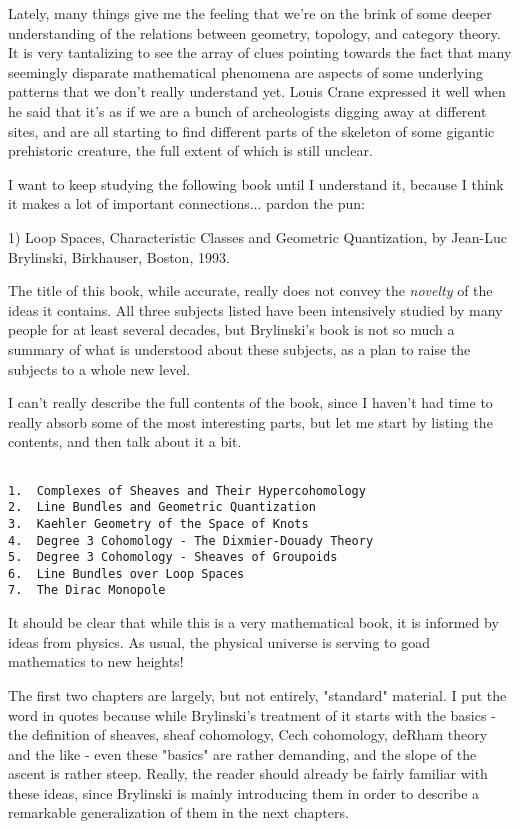 

Lately, many things give me the feeling that we're on the brink of
some deeper understanding of the relations between geometry, topology,
and category theory.  It is very tantalizing to see the array of clues
pointing towards the fact that many seemingly disparate mathematical
phenomena are aspects of some underlying patterns that we don't really
understand yet.  Louis Crane expressed it well when he said that it's as
if we are a bunch of archeologists digging away at different sites,
and are all starting to find different parts of the skeleton of some
gigantic prehistoric creature, the full extent of which is still unclear.

I want to keep studying the following book until I understand it,
because I think it makes a lot of important connections... pardon the
pun:

1) Loop Spaces, Characteristic Classes and Geometric Quantization,
by Jean-Luc Brylinski, Birkhauser, Boston, 1993.

The title of this book, while accurate, really does not convey the
\emph{novelty} of the ideas it contains.  All three subjects listed have been
intensively studied by many people for at least several decades, but
Brylinski's book is not so much a summary of what is understood about
these subjects, as a plan to raise the subjects to a whole new level.

I can't really describe the full contents of the book, since I haven't
had time to really absorb some of the most interesting parts, but let me
start by listing the contents, and then talk about it a bit.


\begin{verbatim}

1.  Complexes of Sheaves and Their Hypercohomology
2.  Line Bundles and Geometric Quantization
3.  Kaehler Geometry of the Space of Knots
4.  Degree 3 Cohomology - The Dixmier-Douady Theory
5.  Degree 3 Cohomology - Sheaves of Groupoids
6.  Line Bundles over Loop Spaces
7.  The Dirac Monopole
\end{verbatim}
    

It should be clear that while this is a very mathematical book, it is
informed by ideas from physics.  As usual, the physical universe is
serving to goad mathematics to new heights!  

The first two chapters are largely, but not entirely, "standard"
material.  I put the word in quotes because while Brylinski's treatment
of it starts with the basics - the definition of sheaves, sheaf
cohomology, Cech cohomology, deRham theory and the like - even these
"basics" are rather demanding, and the slope of the ascent is rather
steep.   Really, the reader should already be fairly familiar with these
ideas, since Brylinski is mainly introducing them in order to describe a
remarkable generalization of them in the next chapters.  

